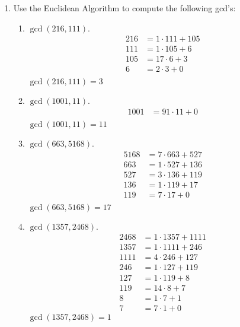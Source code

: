 \documentclass[11pt]{amsart}
\begin{document}
\begin{enumerate}

\item Use the Euclidean Algorithm to compute the following gcd's:\\[3pt]
 \begin{enumerate}
 \item $\gcd(216,111)$.
 {\color{blue}
 \begin{align*}
 216 &= 1\cdot111+105 \\
 111 &= 1\cdot105+6 \\
  105 &= 17\cdot6+3 \\
  6 &= 2\cdot3+0 \\
\end{align*}
$\gcd(216,111) = 3$\\[3pt]

 }
 \item $\gcd(1001,11)$.
 {\color{blue}
 \begin{align*}
 1001 &= 91\cdot11+0 \\
\end{align*}
$\gcd(1001,11) = 11$\\[3pt]

 }
 
 \item $\gcd(663,5168)$.
 {\color{blue}
 \begin{align*}
 5168 &= 7\cdot663+527 \\
 663 &= 1\cdot527+136 \\
  527 &= 3\cdot136+119\\
  136 &= 1\cdot119+17 \\
  119  &= 7\cdot17+0 \\
\end{align*}
$\gcd(663,5168) = 17$\\[3pt]
 }
 
 \item $\gcd(1357,2468)$.
{\color{blue}
 \begin{align*}
 2468 &= 1\cdot1357+1111 \\
 1357 &= 1\cdot1111+246 \\
  1111 &= 4\cdot246+127\\
  246 &= 1\cdot127+119\\
  127  &= 1\cdot119+8 \\
  119  &=14\cdot8+7\\
  8 &= 1\cdot 7 +1\\
  7 &= 7\cdot 1 + 0
\end{align*}
$\gcd(1357,2468) =1$\\[3pt]

}
\end{enumerate}
\end{enumerate}
\end{document}
